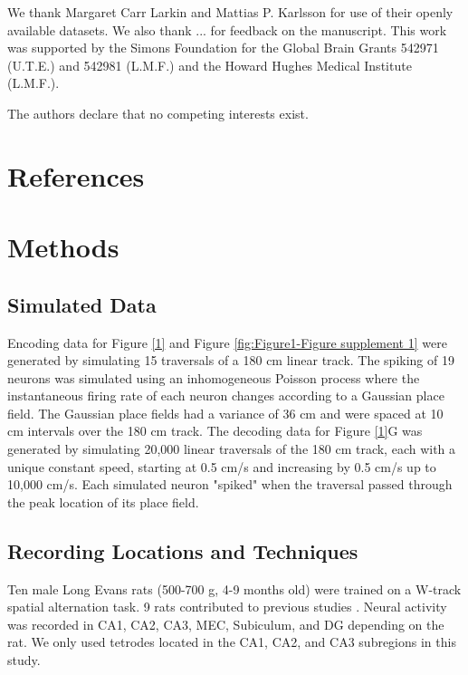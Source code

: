 \documentclass[times, twoside]{zHenriquesLab-StyleBioRxiv}
\begin{document}
\begin{acknowledgements}
We thank Margaret Carr Larkin and Mattias P. Karlsson for use of their openly available datasets. We also thank ... for feedback on the manuscript. This work was supported by the Simons Foundation for the Global Brain Grants 542971 (U.T.E.) and 542981 (L.M.F.) and the Howard Hughes Medical Institute (L.M.F.).
\end{acknowledgements}

The authors declare that no competing interests exist.

\section*{References}


\onecolumn
\newpage

\section*{Methods}

\subsection*{Simulated Data}
Encoding data for Figure \ref{1} and Figure \ref{fig:Figure1-Figure supplement 1} were generated by simulating 15 traversals of a 180 cm linear track. The spiking of 19 neurons was simulated using an inhomogeneous Poisson process where the instantaneous firing rate of each neuron changes according to a Gaussian place field. The Gaussian place fields had a variance of 36 cm and were spaced at 10 cm intervals over the 180 cm track. The decoding data for Figure \ref{1}G was generated by simulating 20,000 linear traversals of the 180 cm track, each with a unique constant speed, starting at 0.5 cm/s and increasing by 0.5 cm/s up to 10,000 cm/s. Each simulated neuron "spiked" when the traversal passed through the peak location of its place field.

\subsection*{Recording Locations and Techniques}
Ten male Long Evans rats (500-700 g, 4-9 months old) were trained on a W-track spatial alternation task. 9 rats contributed to previous studies \cite{KarlssonAwakereplayremote2009, KayConstantSubsecondCycling2020, Kayhippocampalnetworkspatial2016, CarrTransientSlowGamma2012}. Neural activity was recorded in CA1, CA2, CA3, MEC, Subiculum, and DG depending on the rat. We only used tetrodes located in the CA1, CA2, and CA3 subregions in this study.
\end{document}

